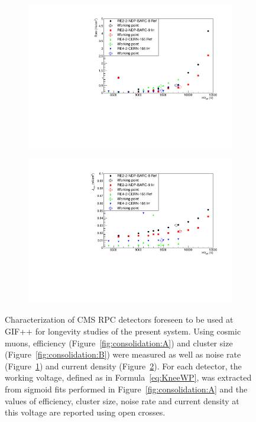 \begin{figure}[H]
\begin{subfigure}{0.5\linewidth}
    		\includegraphics[width = 0.7\plotwidth]{fig/chapt5/Consolidation-Noise-Rate.pdf}
        	\caption{\label{fig:consolidation:C}}
    	\end{subfigure}
    	\begin{subfigure}{0.5\linewidth}
			\centering
    		\includegraphics[width = 0.7\plotwidth]{fig/chapt5/Consolidation-Current-Density.pdf}
        	\caption{\label{fig:consolidation:D}}
    	\end{subfigure}
		\caption{\label{fig:consolidation} Characterization of CMS RPC detectors foreseen to be used at GIF++ for longevity studies of the present system. Using cosmic muons, efficiency (Figure~\ref{fig:consolidation:A}) and cluster size (Figure~\ref{fig:consolidation:B}) were measured as well as noise rate (Figure~\ref{fig:consolidation:C}) and current density (Figure~\ref{fig:consolidation:D}). For each detector, the working voltage, defined as in Formula~\ref{eq:KneeWP}, was extracted from sigmoid fits performed in Figure~\ref{fig:consolidation:A} and the values of efficiency, cluster size, noise rate and current density at this voltage are reported using open crosses.}
	\end{figure}
	
